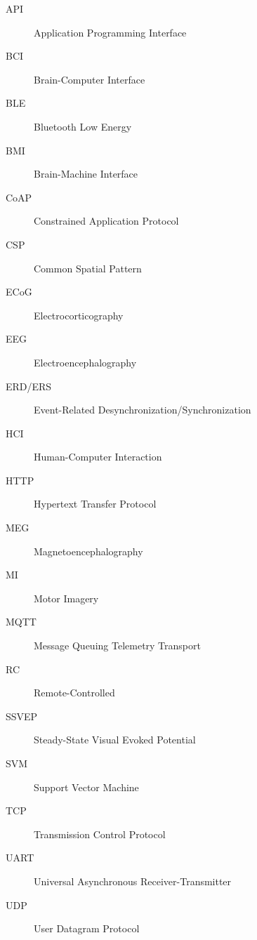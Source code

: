 \clearpage
{}

\begin{description}
  \item[API] Application Programming Interface
  \item[BCI] Brain-Computer Interface
  \item[BLE] Bluetooth Low Energy
  \item[BMI] Brain-Machine Interface
  \item[CoAP] Constrained Application Protocol
  \item[CSP] Common Spatial Pattern
  \item[ECoG] Electrocorticography
  \item[EEG] Electroencephalography
  \item[ERD/ERS] Event-Related Desynchronization/Synchronization
  \item[HCI] Human-Computer Interaction
  \item[HTTP] Hypertext Transfer Protocol
  \item[MEG] Magnetoencephalography
  \item[MI] Motor Imagery
  \item[MQTT] Message Queuing Telemetry Transport
  \item[RC] Remote-Controlled
  \item[SSVEP] Steady-State Visual Evoked Potential
  \item[SVM] Support Vector Machine
  \item[TCP] Transmission Control Protocol
  \item[UART] Universal Asynchronous Receiver-Transmitter
  \item[UDP] User Datagram Protocol
\end{description}
